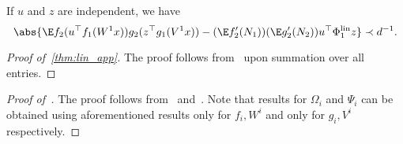 \begin{lemma}
\label{lem:off_diag}
If \(u\) and \(z\) are independent, we have
    \begin{equation}
        \abs{\E f_2(u^{\top} f_1(W^1x)) g_2(z^{\top} g_1(V^1x)) - (\E f_2'(N_1)) (\E g_2'(N_2)) u^\top \Phi_1^{\mathrm{lin}} z} \prec d^{-1}.
    \end{equation}
\end{lemma}


\begin{proof}[Proof of~\cref{thm:lin_app}]
    The proof follows from~ upon summation over all entries.
\end{proof}

\begin{proof}[Proof of~]
The proof follows from~ and~. Note that results for \(\Omega_i\) and \(\Psi_i\) can be obtained using aforementioned results only for \(f_i, W^i\) and only for \(g_i, V^i\) respectively.
\end{proof}


